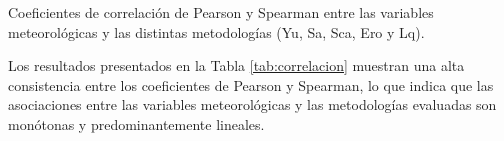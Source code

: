 \documentclass[letterpaper,12pt, twoside]{report}
\providecommand{\DIFdeltex}[1]{{\protect\color{red} \scriptsize #1}} %
\providecommand{\DIFdelFL}[1]{\DIFdel{#1}} %
\providecommand{\DIFdel}[1]{\texorpdfstring{\DIFdeltex{#1}}{}} %
\begin{document}
{%
\DIFdelFL{Coeficientes de correlación de Pearson y Spearman entre las variables meteorológicas y las distintas metodologías (Yu, Sa, Sca, Ero y Lq).}}

\DIFdel{Los resultados presentados en la Tabla \ref{tab:correlacion} muestran una alta consistencia entre los coeficientes de Pearson y Spearman, lo que indica que las asociaciones entre las variables meteorológicas y las metodologías evaluadas son monótonas y predominantemente lineales.
}%
\end{document}
